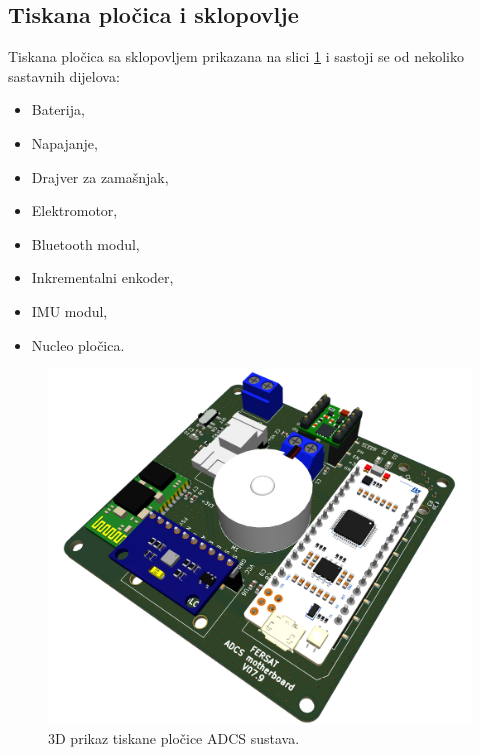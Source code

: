 \documentclass[times, utf8, diplomski, numeric]{templates/template}
\begin{document}
{{        \subsection{Tiskana pločica i sklopovlje}{
            Tiskana pločica sa sklopovljem prikazana na slici \ref{fig:plocica_3d} i sastoji se od nekoliko sastavnih dijelova:

            \begin{itemize}
            \item Baterija,
            \item Napajanje,
            \item Drajver za zamašnjak,
            \item Elektromotor,
            \item Bluetooth modul,
            \item Inkrementalni enkoder,
            \item IMU modul,
            \item Nucleo pločica.
            \end{itemize}

            \begin{figure}[htb]
            \centering
            \includegraphics[width=1.0\textwidth]{images/plocica_3d.png}
            \caption{3D prikaz tiskane pločice ADCS sustava.}
            \label{fig:plocica_3d}
            \end{figure}

}}}
\end{document}
